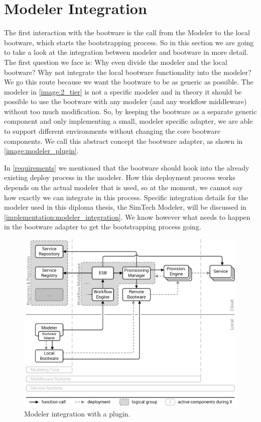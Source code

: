 \section{Modeler Integration}
\label{design:modeler_integration}

The first interaction with the bootware is the call from the Modeler to the local bootware, which starts the bootstrapping process.
So in this section we are going to take a look at the integration between modeler and bootware in more detail.
The first question we face is: Why even divide the modeler and the local bootware?
Why not integrate the local bootware functionality into the modeler?
We go this route because we want the bootware to be as generic as possible.
The modeler in \autoref{image:2_tier} is not a specific modeler and in theory it should be possible to use the bootware with any modeler (and any workflow middleware) without too much modification.
So, by keeping the bootware as a separate generic component and only implementing a small, modeler specific adapter, we are able to support different environments without changing the core bootware components.
We call this abstract concept the bootware adapter, as shown in \autoref{image:modeler_plugin}.

In \autoref{requirements} we mentioned that the bootware should hook into the already existing deploy process in the modeler.
How this deployment process works depends on the actual modeler that is used, so at the moment, we cannot say how exactly we can integrate in this process.
Specific integration details for the modeler used in this diploma thesis, the SimTech Modeler, will be discussed in \autoref{implementation:modeler_integration}.
We know however what needs to happen in the bootware adapter to get the bootstrapping process going.

\begin{figure}[!htbp]
	\centering
	\includegraphics[resolution=600]{design/assets/modeler_plugin}
	\caption{Modeler integration with a plugin.}
	\label{image:modeler_plugin}
\end{figure}

